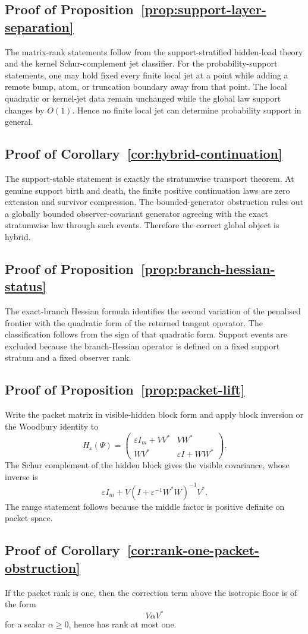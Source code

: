 \documentclass[11pt,a4paper]{article}
\numberwithin{equation}{section}
\theoremstyle{thmcompact}
\theoremstyle{remark}
\begin{document}
\subsection*{Proof of Proposition~\ref{prop:support-layer-separation}}
The matrix-rank statements follow from the support-stratified hidden-load theory and the kernel Schur-complement jet classifier. For the probability-support statements, one may hold fixed every finite local jet at a point while adding a remote bump, atom, or truncation boundary away from that point. The local quadratic or kernel-jet data remain unchanged while the global law support changes by $O(1)$. Hence no finite local jet can determine probability support in general.

\subsection*{Proof of Corollary~\ref{cor:hybrid-continuation}}
The support-stable statement is exactly the stratumwise transport theorem. At genuine support birth and death, the finite positive continuation laws are zero extension and survivor compression. The bounded-generator obstruction rules out a globally bounded observer-covariant generator agreeing with the exact stratumwise law through such events. Therefore the correct global object is hybrid.

\subsection*{Proof of Proposition~\ref{prop:branch-hessian-status}}
The exact-branch Hessian formula identifies the second variation of the penalised frontier with the quadratic form of the returned tangent operator. The classification follows from the sign of that quadratic form. Support events are excluded because the branch-Hessian operator is defined on a fixed support stratum and a fixed observer rank.

\subsection*{Proof of Proposition~\ref{prop:packet-lift}}
Write the packet matrix in visible-hidden block form and apply block inversion or the Woodbury identity to
\begin{equation}
H_\varepsilon(\Psi)=
\begin{pmatrix}
\varepsilon I_m+VV^* & VW^*\\
WV^* & \varepsilon I+WW^*
\end{pmatrix}.
\end{equation}
The Schur complement of the hidden block gives the visible covariance, whose inverse is
\begin{equation}
\varepsilon I_m+V(I+\varepsilon^{-1}W^*W)^{-1}V^*.
\end{equation}
The range statement follows because the middle factor is positive definite on packet space.

\subsection*{Proof of Corollary~\ref{cor:rank-one-packet-obstruction}}
If the packet rank is one, then the correction term above the isotropic floor is of the form
\begin{equation}
V\alpha V^*
\end{equation}
for a scalar $\alpha\ge 0$, hence has rank at most one.
\end{document}
